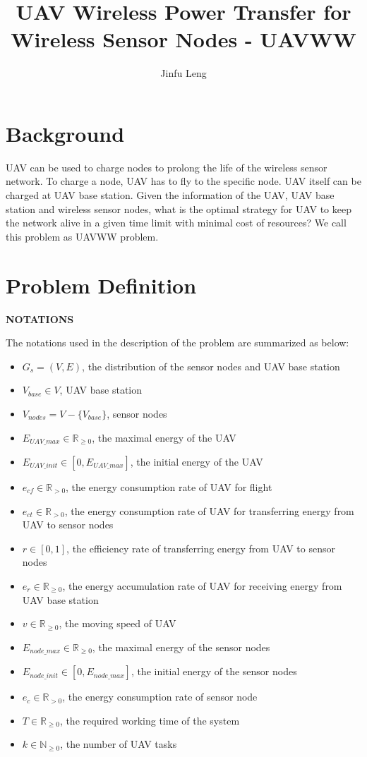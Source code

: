 \documentclass[11pt]{article}
\begin{document}
\title{UAV Wireless Power Transfer for Wireless Sensor Nodes - UAVWW}
\author{Jinfu Leng}
\maketitle
\section{Background}
UAV can be used to charge nodes to prolong the life of the wireless sensor network. To charge a node, UAV has to fly to the specific node. UAV itself can be charged at UAV base station. Given the information of the UAV, UAV base station and wireless sensor nodes, what is the optimal strategy for UAV to keep the network alive in a given time limit with minimal cost of resources? We call this problem as UAVWW problem.

\section{Problem Definition}
\textbf{NOTATIONS}

The notations used in the description of the problem are summarized as below:
\begin{itemize}[noitemsep]
\item $G_s = (V, E)$, the distribution of the sensor nodes and UAV base station
\item $V_{base} \in V$, UAV base station
\item $V_{nodes} = V - \{V_{base}\}$, sensor nodes
\item $E_{UAV\_max} \in \mathbb{R}_{\geq0}$, the maximal energy of the UAV
\item $E_{UAV\_init} \in [0, E_{UAV\_max}]$, the initial energy of the UAV
\item $e_{cf} \in \mathbb{R}_{>0}$, the energy consumption rate of UAV for flight
\item $e_{ct} \in \mathbb{R}_{>0}$, the energy consumption rate of UAV for transferring energy from UAV to sensor nodes
\item $r \in [0, 1]$, the efficiency rate of transferring energy from UAV to sensor nodes
\item $e_r \in \mathbb{R}_{\geq0}$, the energy accumulation rate of UAV for receiving energy from UAV base station
\item $v \in \mathbb{R}_{\geq0}$, the moving speed of UAV
\item $E_{node\_max} \in \mathbb{R}_{\geq0}$, the maximal energy of the sensor nodes
\item $E_{node\_init} \in [0, E_{node\_max}]$, the initial energy of the sensor nodes
\item $e_{c} \in \mathbb{R}_{>0}$, the energy consumption rate of sensor node
\item $T \in \mathbb{R}_{\geq0}$, the required working time of the system
\item $k \in \mathbb{N}_{\geq0}$, the number of UAV tasks
\end{itemize}
\end{document}
